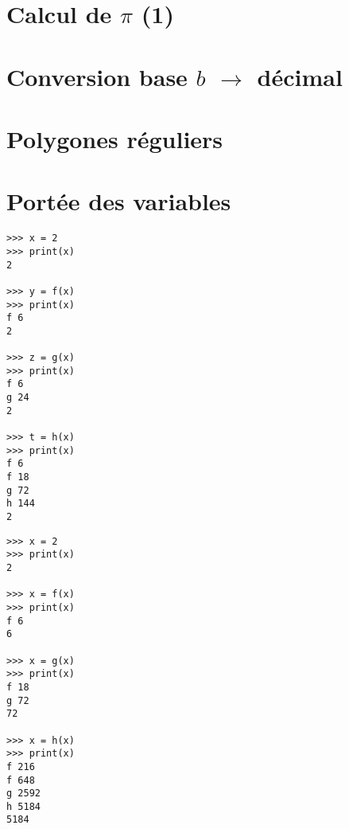 \documentclass[11pt,a4paper]{article}
\begin{document}

\section{Calcul de $\pi$ (1)}


\section{Conversion base $b$ $\rightarrow$ décimal}


\section{Polygones réguliers}


\section{Portée des variables}
%

\begin{minipage}[t]{7cm}\footnotesize
\begin{verbatim}
>>> x = 2
>>> print(x)
2

>>> y = f(x)
>>> print(x)
f 6
2

>>> z = g(x)
>>> print(x)
f 6
g 24
2

>>> t = h(x)
>>> print(x)
f 6
f 18
g 72
h 144
2
\end{verbatim}
\end{minipage}
\hfill
\begin{minipage}[t]{7cm}\footnotesize
\begin{verbatim}
>>> x = 2
>>> print(x)
2

>>> x = f(x)
>>> print(x)
f 6
6

>>> x = g(x)
>>> print(x)
f 18
g 72
72

>>> x = h(x)
>>> print(x)
f 216
f 648
g 2592
h 5184
5184
\end{verbatim}
\end{minipage}
\end{document}
